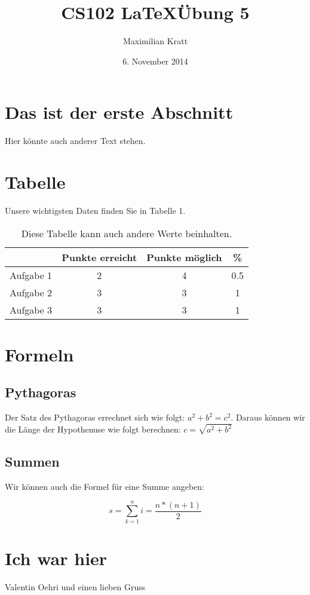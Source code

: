\documentclass[11pt,a4paper]{article}
\date{6. November 2014}
\author{Maximilian Kratt}
\title{CS102   \LaTeX    \"Ubung 5}
\begin{document}
\maketitle
\section{Das ist der erste Abschnitt}
Hier k\"onnte auch anderer Text stehen.
\section{Tabelle}
Unsere wichtigsten Daten finden Sie in Tabelle 1.
\begin{table} [htbp]
\centering
\begin{tabular}{c|c|c|c}
  & Punkte erreicht & Punkte m\"oglich & \% \\
\hline
Aufgabe 1 & 2 & 4 & 0.5 \\
Aufgabe 2 & 3 & 3 & 1 \\
Aufgabe 3 & 3 & 3 & 1 \\
\end{tabular}
\caption{Diese Tabelle kann auch andere Werte beinhalten.}
\end{table}

\section{Formeln}
\subsection{Pythagoras}
Der Satz des Pythagoras errechnet sich wie folgt: $a^2+b^2=c^2$. Daraus k\"onnen wir die L\"ange der Hypothenuse wie folgt berechnen: $c=\sqrt{a^2+b^2}$
\subsection{Summen}
Wir k\"onnen auch die Formel f\"ur eine Summe angeben:

\begin{equation}
s = \sum_{k=1}^ni=\frac{n*(n+1)}{2}
\end{equation}
\section{Ich war hier}
Valentin Oehri und einen lieben Gruss 
\end{document}
